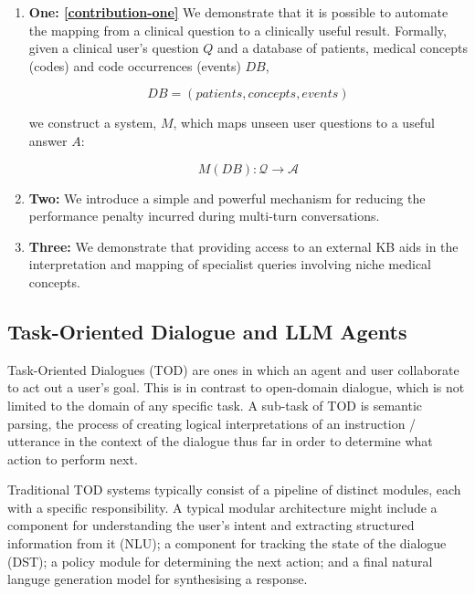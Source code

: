 \documentclass[11pt]{article}
\begin{document}
\begin{enumerate}

\item \textbf{One: \ref{contribution-one}} We demonstrate that it is possible to automate the mapping from a clinical question to a clinically useful result. Formally, given a clinical user's question $Q$ and a database of patients, medical concepts (codes) and code occurrences (events) $DB$,

  $$ DB = (patients, concepts, events) $$

we construct a system, $M$, which maps unseen user questions to a useful answer $A$:

  $$ M(DB): \mathcal{Q} \rightarrow \mathcal{A} $$

\item \textbf{Two:} We introduce a simple and powerful mechanism for reducing the performance penalty incurred during multi-turn conversations. %

\item \textbf{Three:}  We demonstrate that providing access to an external KB aids in the interpretation and mapping of specialist queries involving niche medical concepts.
\end{enumerate}


\subsection{Task-Oriented Dialogue and LLM Agents}
Task-Oriented Dialogues (TOD) are ones in which an agent and user collaborate to act out a user's goal. This is in contrast to open-domain dialogue, which is not limited to the domain of any specific task. A sub-task of TOD is semantic parsing, the process of creating logical interpretations of an instruction / utterance in the context of the dialogue thus far in order to determine what action to perform next.

Traditional TOD systems typically consist of a pipeline of distinct modules, each with a specific responsibility. A typical modular architecture might include a component for understanding the user's intent and extracting structured information from it (NLU); a component for tracking the state of the dialogue (DST); a policy module for determining the next action; and a final natural languge generation model for synthesising a response.  
\end{document}
